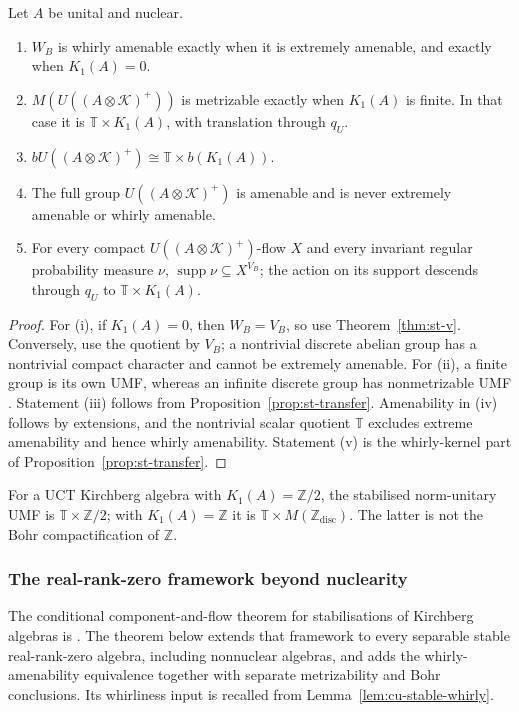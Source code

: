 \begin{corollary}\label{cor:st-unitary-consequences}
Let \(A\) be unital and nuclear.
\begin{enumerate}
\item \(W_B\) is whirly amenable exactly when it is extremely amenable,
and exactly when \(K_1(A)=0\).
\item \(M(U((A\otimes\mathcal K)^+))\) is metrizable exactly when \(K_1(A)\)
is finite. In that case it is \(\mathbb T\times K_1(A)\), with translation
through \(q_U\).
\item \(bU((A\otimes\mathcal K)^+)\cong\mathbb T\times b(K_1(A))\).
\item The full group \(U((A\otimes\mathcal K)^+)\) is amenable and is never
extremely amenable or whirly amenable.
\item For every compact \(U((A\otimes\mathcal K)^+)\)-flow \(X\) and every
invariant regular probability measure \(\nu\),
\(\operatorname{supp}\nu\subseteq X^{V_B}\); the action on its support
descends through \(q_U\) to \(\mathbb T\times K_1(A)\).
\end{enumerate}
\end{corollary}
\begin{proof}
For (i), if \(K_1(A)=0\), then \(W_B=V_B\), so use
Theorem~\ref{thm:st-v}. Conversely, use the quotient by \(V_B\);
a nontrivial discrete abelian
group has a nontrivial compact character and cannot be extremely
amenable. For (ii), a finite group is its own UMF, whereas an
infinite discrete group has nonmetrizable UMF \cite{Pestov2006}.
Statement (iii) follows from
Proposition~\ref{prop:st-transfer}. Amenability in (iv) follows by
extensions, and the nontrivial scalar quotient \(\mathbb T\) excludes
extreme amenability and hence whirly amenability.
Statement (v) is the whirly-kernel part of Proposition~\ref{prop:st-transfer}.
\end{proof}

\begin{example}\label{ex:st-example-1}
For a UCT Kirchberg algebra with \(K_1(A)=\mathbb Z/2\), the stabilised
norm-unitary UMF is
\(\mathbb T\times\mathbb Z/2\); with \(K_1(A)=\mathbb Z\) it is
\(\mathbb T\times M(\mathbb Z_{\mathrm{disc}})\).
The latter is not the Bohr compactification of \(\mathbb Z\).
\end{example}


\subsubsection{The real-rank-zero framework beyond nuclearity}
The conditional component-and-flow theorem for stabilisations of
Kirchberg algebras is \cite[Theorem~9.1]{LupiniCuntz2026}. The theorem below
extends that framework to every separable stable real-rank-zero algebra,
including nonnuclear algebras, and adds the whirly-amenability equivalence
together with separate metrizability and Bohr conclusions. Its whirliness
input is recalled from Lemma~\ref{lem:cu-stable-whirly}.

